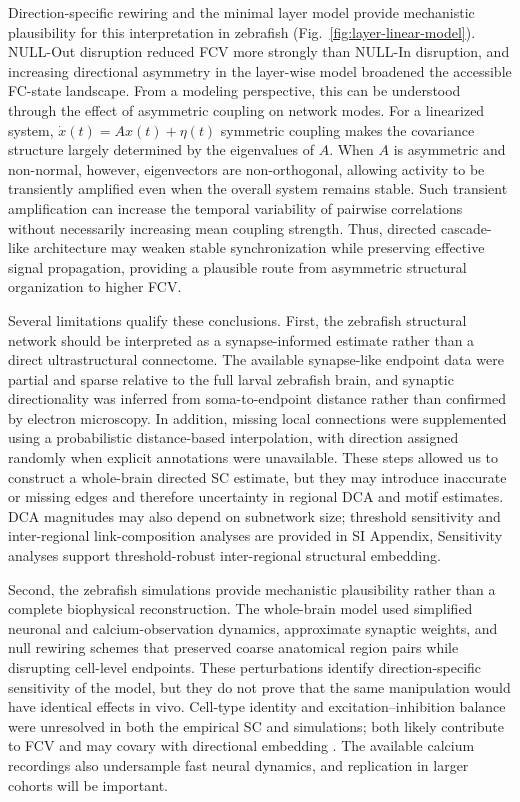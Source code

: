 \documentclass[9pt,twocolumn,twoside]{pnas-new}
\begin{document}
Direction-specific rewiring and the minimal layer model provide mechanistic plausibility for this interpretation in zebrafish (Fig.~\ref{fig:layer-linear-model}). NULL-Out disruption reduced FCV more strongly than NULL-In disruption, and increasing directional asymmetry in the layer-wise model broadened the accessible FC-state landscape. From a modeling perspective, this can be understood through the effect of asymmetric coupling on network modes. For a linearized system,
$
\dot{x}(t) = A x(t) + \eta(t)
$
symmetric coupling makes the covariance structure largely determined by the eigenvalues of $A$. When $A$ is asymmetric and non-normal, however, eigenvectors are non-orthogonal, allowing activity to be transiently amplified even when the overall system remains stable. Such transient amplification can increase the temporal variability of pairwise correlations without necessarily increasing mean coupling strength. Thus, directed cascade-like architecture may weaken stable synchronization while preserving effective signal propagation, providing a plausible route from asymmetric structural organization to higher FCV.

Several limitations qualify these conclusions. First, the zebrafish structural network should be interpreted as a synapse-informed estimate rather than a direct ultrastructural connectome. The available synapse-like endpoint data were partial and sparse relative to the full larval zebrafish brain, and synaptic directionality was inferred from soma-to-endpoint distance rather than confirmed by electron microscopy. In addition, missing local connections were supplemented using a probabilistic distance-based interpolation, with direction assigned randomly when explicit annotations were unavailable. These steps allowed us to construct a whole-brain directed SC estimate, but they may introduce inaccurate or missing edges and therefore uncertainty in regional DCA and motif estimates. DCA magnitudes may also depend on subnetwork size; threshold sensitivity and inter-regional link-composition analyses are provided in SI Appendix, Sensitivity analyses support threshold-robust inter-regional structural embedding.

Second, the zebrafish simulations provide mechanistic plausibility rather than a complete biophysical reconstruction. The whole-brain model used simplified neuronal and calcium-observation dynamics, approximate synaptic weights, and null rewiring schemes that preserved coarse anatomical region pairs while disrupting cell-level endpoints. These perturbations identify direction-specific sensitivity of the model, but they do not prove that the same manipulation would have identical effects in vivo. Cell-type identity and excitation--inhibition balance were unresolved in both the empirical SC and simulations; both likely contribute to FCV and may covary with directional embedding \citep{mueller2006phylotypic,ganz2012subpallium,Witvliet2020Connectome}. The available calcium recordings also undersample fast neural dynamics, and replication in larger cohorts will be important.
\end{document}
